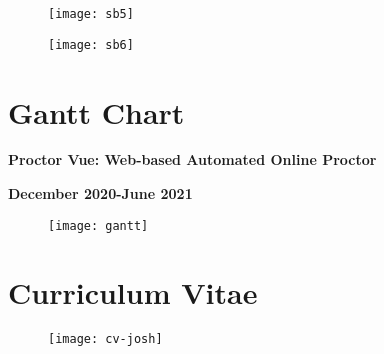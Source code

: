 \begin{figure}[!ht]
  \begin{center}
    \texttt{[image: sb5]}
  \end{center}
\end{figure}

\begin{figure}[!ht]
  \begin{center}
    \texttt{[image: sb6]}
  \end{center}
\end{figure}

\chapter{Gantt Chart}

\begin{center}
  \textbf{Proctor Vue: Web-based Automated Online Proctor}

  \textbf{December 2020-June 2021}
\end{center}

\begin{figure}[!ht]
  \begin{center}
    \texttt{[image: gantt]}
  \end{center}
\end{figure}

\chapter{Curriculum Vitae}

\begin{figure}[!ht]
  \begin{center}
    \texttt{[image: cv-josh]}
  \end{center}
\end{figure}








